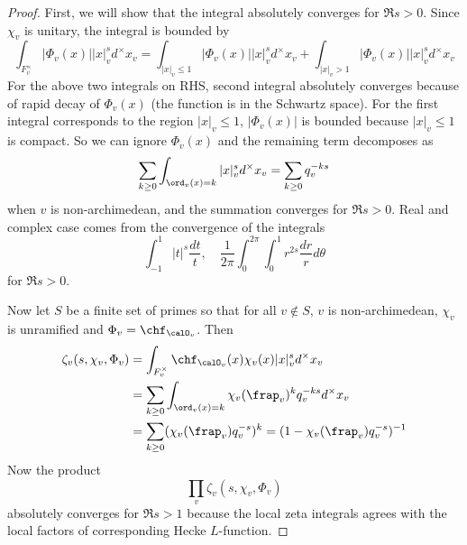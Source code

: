 \begin{proof}
First, we will show that the integral absolutely converges for $\Re s > 0$. 
Since $\chi_{v}$ is unitary, the integral is bounded by 
$$
\int_{F_{v}^{\times}} |\Phi_{v}(x)| |x|_{v}^{s} d^{\times}x_{v}  = \int_{|x|_{v} \leq 1}|\Phi_{v}(x)| |x|_{v}^{s} d^{\times}x_{v} + \int_{|x|_{v} > 1} |\Phi_{v}(x)| |x|_{v}^{s} d^{\times}x_{v}
$$
For the above two integrals on RHS, second integral absolutely converges because of rapid decay of $\Phi_{v}(x)$ (the function is in the Schwartz space). For the first integral corresponds to the region $|x|_{v} \leq 1$, $|\Phi_{v}(x)|$ is bounded because $|x|_{v} \leq 1$ is compact. So we can ignore $\Phi_{v}(x)$ and the remaining term decomposes as
$$
\sum_{k\geq 0} \int_{\ord_{v}(x) = k} |x|_{v}^{s} d^{\times}x_{v} = \sum_{k\geq 0} q_{v}^{-ks}
$$
when $v$ is non-archimedean, and the summation converges for $\Re s >0$. Real and complex case comes from the convergence of the integrals
$$
\int_{-1}^{1} |t|^{s} \frac{dt}{t}, \quad \frac{1}{2\pi} \int_{0}^{2\pi} \int_{0}^{1} r^{2s} \frac{dr}{r} d\theta
$$
for $\Re s >0$. 

Now let $S$ be a finite set of primes so that for all $v\not\in S$, $v$ is non-archimedean, $\chi_{v}$ is unramified and $\Phi_{v} = \chf_{\calO_{v}}$. Then 
\begin{align*}
\zeta_{v}(s, \chi_{v}, \Phi_{v}) &= \int_{F_{v}^{\times}} \chf_{\calO_{v}}(x) \chi_{v}(x) |x|_{v}^{s} d^{\times}x_{v} \\
&= \sum_{k\geq 0} \int_{\ord_{v}(x) = k} \chi_{v}(\frap_{v})^{k} q_{v}^{-ks} d^{\times}x_{v} \\
&= \sum_{k\geq 0} (\chi_{v}(\frap_{v})q_{v}^{-s})^{k} = (1-\chi_{v}(\frap_{v})q_{v}^{-s})^{-1}
\end{align*}
Now the product 
$$
\prod_{v} \zeta_{v}(s, \chi_{v}, \Phi_{v})
$$
absolutely converges for $\Re s > 1$ because the local zeta integrals agrees with the local factors of corresponding Hecke $L$-function. 
\end{proof}


